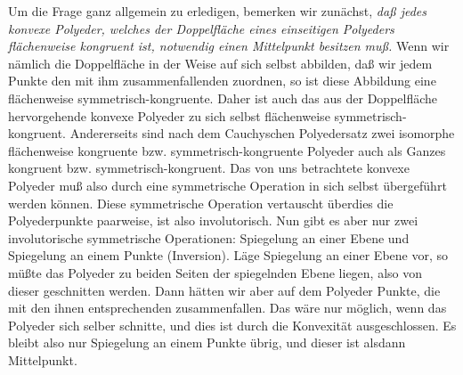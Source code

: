 \documentclass[11pt,a4paper]{article}
\begin{document}
Um die Frage ganz allgemein zu erledigen, bemerken wir zun\"achst, \emph{da\ss{} jedes konvexe Polyeder, welches der Doppelfl\"ache eines einseitigen Polyeders fl\"achenweise kongruent ist, notwendig einen Mittelpunkt besitzen mu\ss{}.} Wenn wir n\"amlich die Doppelfl\"ache in der Weise auf sich selbst abbilden, da\ss{} wir jedem Punkte den mit ihm zusammenfallenden zuordnen, so ist diese Abbildung eine fl\"achenweise symmetrisch-kongruente. Daher ist auch das aus der Doppelfl\"ache hervorgehende konvexe Polyeder zu sich selbst fl\"achenweise symmetrisch-kongruent. Andererseits sind nach dem Cauchyschen Polyedersatz zwei isomorphe fl\"achenweise kongruente bzw. symmetrisch-kongruente Polyeder auch als Ganzes kongruent bzw. symmetrisch-kongruent. Das von uns betrachtete konvexe Polyeder mu\ss{} also durch eine symmetrische Operation in sich selbst \"ubergef\"uhrt werden k\"onnen. Diese symmetrische Operation vertauscht \"uberdies die Polyederpunkte paarweise, ist also involutorisch. Nun gibt es aber nur zwei involutorische symmetrische Operationen: Spiegelung an einer Ebene und Spiegelung an einem Punkte (Inversion). L\"age Spiegelung an einer Ebene vor, so m\"u\ss{}te das Polyeder zu beiden Seiten der spiegelnden Ebene liegen, also von dieser geschnitten werden. Dann h\"atten wir aber auf dem Polyeder Punkte, die mit den ihnen entsprechenden zusammenfallen. Das w\"are nur m\"oglich, wenn das Polyeder sich selber schnitte, und dies ist durch die Konvexit\"at ausgeschlossen. Es bleibt also nur Spiegelung an einem Punkte \"ubrig, und dieser ist alsdann Mittelpunkt.
\end{document}
